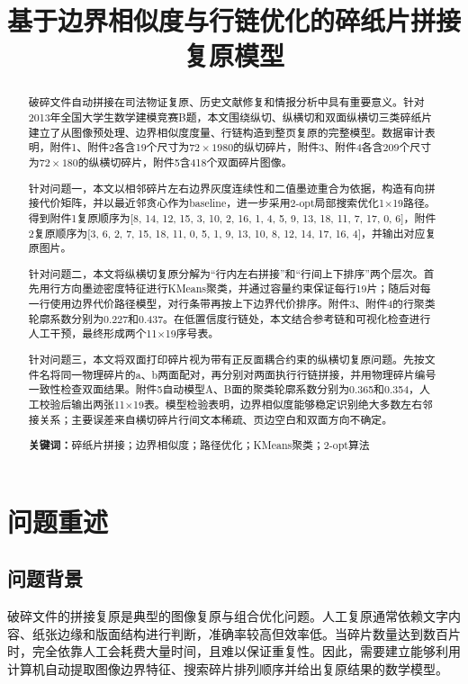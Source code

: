 \documentclass[UTF8,a4paper,12pt]{ctexart}
\title{基于边界相似度与行链优化的碎纸片拼接复原模型}
\author{}
\date{}
\begin{document}
\maketitle
\begin{abstract}
破碎文件自动拼接在司法物证复原、历史文献修复和情报分析中具有重要意义。针对2013年全国大学生数学建模竞赛B题，本文围绕纵切、纵横切和双面纵横切三类碎纸片建立了从图像预处理、边界相似度度量、行链构造到整页复原的完整模型。数据审计表明，附件1、附件2各含19个尺寸为$72\times1980$的纵切碎片，附件3、附件4各含209个尺寸为$72\times180$的纵横切碎片，附件5含418个双面碎片图像。

针对问题一，本文以相邻碎片左右边界灰度连续性和二值墨迹重合为依据，构造有向拼接代价矩阵，并以最近邻贪心作为baseline，进一步采用2-opt局部搜索优化1×19路径。得到附件1复原顺序为[8, 14, 12, 15, 3, 10, 2, 16, 1, 4, 5, 9, 13, 18, 11, 7, 17, 0, 6]，附件2复原顺序为[3, 6, 2, 7, 15, 18, 11, 0, 5, 1, 9, 13, 10, 8, 12, 14, 17, 16, 4]，并输出对应复原图片。

针对问题二，本文将纵横切复原分解为“行内左右拼接”和“行间上下排序”两个层次。首先用行方向墨迹密度特征进行KMeans聚类，并通过容量约束保证每行19片；随后对每一行使用边界代价路径模型，对行条带再按上下边界代价排序。附件3、附件4的行聚类轮廓系数分别为0.227和0.437。在低置信度行链处，本文结合参考链和可视化检查进行人工干预，最终形成两个11×19序号表。

针对问题三，本文将双面打印碎片视为带有正反面耦合约束的纵横切复原问题。先按文件名将同一物理碎片的a、b两面配对，再分别对两面执行行链拼接，并用物理碎片编号一致性检查双面结果。附件5自动模型A、B面的聚类轮廓系数分别为0.365和0.354，人工校验后输出两张11×19表。模型检验表明，边界相似度能够稳定识别绝大多数左右邻接关系；主要误差来自横切碎片行间文本稀疏、页边空白和双面方向不确定。

\textbf{关键词：}碎纸片拼接；边界相似度；路径优化；KMeans聚类；2-opt算法
\end{abstract}
\newpage\tableofcontents\newpage

\section{问题重述}
\subsection{问题背景}
破碎文件的拼接复原是典型的图像复原与组合优化问题。人工复原通常依赖文字内容、纸张边缘和版面结构进行判断，准确率较高但效率低。当碎片数量达到数百片时，完全依靠人工会耗费大量时间，且难以保证重复性。因此，需要建立能够利用计算机自动提取图像边界特征、搜索碎片排列顺序并给出复原结果的数学模型。
\end{document}

